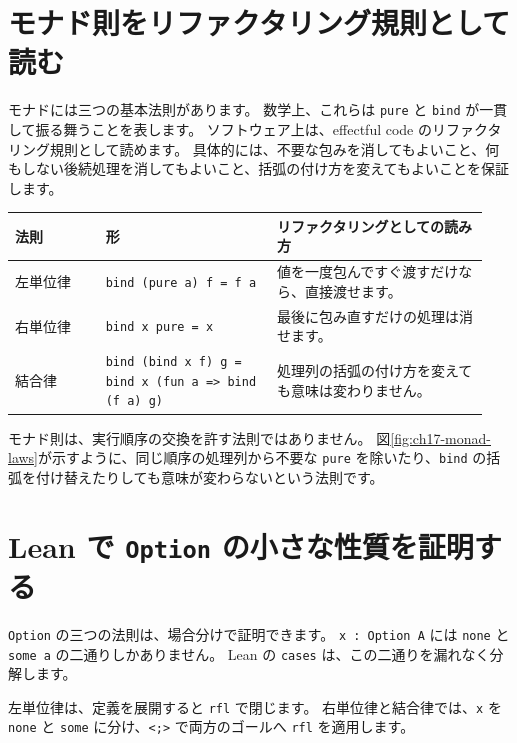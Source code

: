 \section{モナド則をリファクタリング規則として読む}

モナドには三つの基本法則があります。
数学上、これらは \texttt{pure} と \texttt{bind} が一貫して振る舞うことを表します。
ソフトウェア上は、effectful code のリファクタリング規則として読めます。
具体的には、不要な包みを消してもよいこと、何もしない後続処理を消してもよいこと、括弧の付け方を変えてもよいことを保証します。

\begin{center}
\small
\setlength{\tabcolsep}{3pt}
\begin{tabular}{@{}p{0.18\linewidth}p{0.34\linewidth}p{0.42\linewidth}@{}}
\toprule
法則 & 形 & リファクタリングとしての読み方 \\
\midrule
左単位律 & \texttt{bind (pure a) f = f a} & 値を一度包んですぐ渡すだけなら、直接渡せます。 \\
右単位律 & \texttt{bind x pure = x} & 最後に包み直すだけの処理は消せます。 \\
結合律 & \texttt{bind (bind x f) g = bind x (fun a => bind (f a) g)} & 処理列の括弧の付け方を変えても意味は変わりません。 \\
\bottomrule
\end{tabular}
\end{center}

モナド則は、実行順序の交換を許す法則ではありません。
図\ref{fig:ch17-monad-laws}が示すように、同じ順序の処理列から不要な \texttt{pure} を除いたり、\texttt{bind} の括弧を付け替えたりしても意味が変わらないという法則です。


\section{Lean で \texttt{Option} の小さな性質を証明する}

\texttt{Option} の三つの法則は、場合分けで証明できます。
\texttt{x : Option A} には \texttt{none} と \texttt{some a} の二通りしかありません。
Lean の \texttt{cases} は、この二通りを漏れなく分解します。

左単位律は、定義を展開すると \texttt{rfl} で閉じます。
右単位律と結合律では、\texttt{x} を \texttt{none} と \texttt{some} に分け、\texttt{<;>} で両方のゴールへ \texttt{rfl} を適用します。

